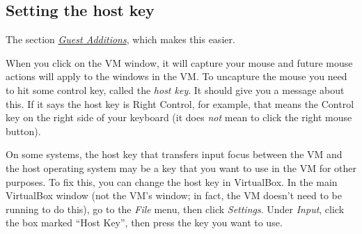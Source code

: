 \documentclass[letterpaper,10pt,english]{sphinxmanual}
\begin{document}
\subsection{Setting the host key}
\label{vm:setting-the-host-key}



The section {\hyperref[vm:vm-additions]{\emph{Guest Additions}}}, which makes this easier.



When you click on the VM window, it will capture your mouse and future mouse
actions will apply to the windows in the VM.  To uncapture the mouse you
need to hit some control key, called the \emph{host key}.  It should give you a
message about this.  If it says the host key is Right Control, for example,
that means the Control key on the right side of your keyboard (it does \emph{not}
mean to click the right mouse button).

On some systems, the host key that transfers input focus between the
VM and the host operating system may be a key that you want to use in
the VM for other purposes.  To fix this, you can
change the host key in VirtualBox.  In the main VirtualBox window (not
the VM's window; in fact, the VM doesn't need to be running to do
this), go to the \emph{File} menu, then click \emph{Settings}.  Under \emph{Input},
click the box marked ``Host Key'', then press the key you want to use.
\end{document}

